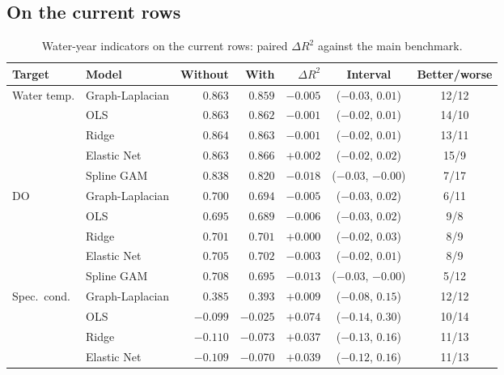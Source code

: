 \documentclass[11pt]{article}
\begin{document}
\subsection{On the current rows}

\begin{table}[h]
\centering
\small
\caption{Water-year indicators on the current rows: paired $\Delta R^2$ against the main benchmark.}
\label{tab:wy}
\begin{tabular}{ll rrrcc}
\toprule
Target & Model & Without & With & $\Delta R^2$ & Interval & Better/worse \\
\midrule
Water temp.   & Graph-Laplacian & $0.863$ & $0.859$ & $-0.005$ & ($-0.03$, $0.01$) & 12/12 \\
              & OLS             & $0.863$ & $0.862$ & $-0.001$ & ($-0.02$, $0.01$) & 14/10 \\
              & Ridge           & $0.864$ & $0.863$ & $-0.001$ & ($-0.02$, $0.01$) & 13/11 \\
              & Elastic Net     & $0.863$ & $0.866$ & $+0.002$ & ($-0.02$, $0.02$) & 15/9 \\
              & Spline GAM      & $0.838$ & $0.820$ & $\mathbf{-0.018}$ & ($-0.03$, $-0.00$) & 7/17 \\
\addlinespace
DO            & Graph-Laplacian & $0.700$ & $0.694$ & $-0.005$ & ($-0.03$, $0.02$) & 6/11 \\
              & OLS             & $0.695$ & $0.689$ & $-0.006$ & ($-0.03$, $0.02$) & 9/8 \\
              & Ridge           & $0.701$ & $0.701$ & $+0.000$ & ($-0.02$, $0.03$) & 8/9 \\
              & Elastic Net     & $0.705$ & $0.702$ & $-0.003$ & ($-0.02$, $0.01$) & 8/9 \\
              & Spline GAM      & $0.708$ & $0.695$ & $\mathbf{-0.013}$ & ($-0.03$, $-0.00$) & 5/12 \\
\addlinespace
Spec.\ cond.  & Graph-Laplacian & $0.385$ & $0.393$ & $+0.009$ & ($-0.08$, $0.15$) & 12/12 \\
              & OLS             & $-0.099$ & $-0.025$ & $+0.074$ & ($-0.14$, $0.30$) & 10/14 \\
              & Ridge           & $-0.110$ & $-0.073$ & $+0.037$ & ($-0.13$, $0.16$) & 11/13 \\
              & Elastic Net     & $-0.109$ & $-0.070$ & $+0.039$ & ($-0.12$, $0.16$) & 11/13 \\

\end{tabular}
\end{table}
\end{document}
